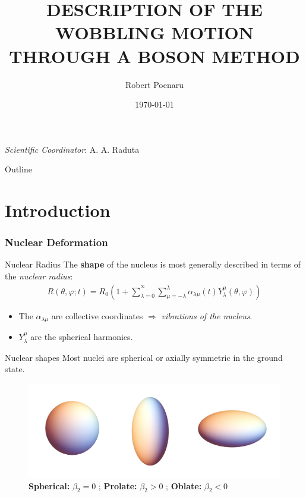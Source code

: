 \documentclass{beamer}
\title[presentation]{DESCRIPTION OF THE WOBBLING MOTION THROUGH A BOSON METHOD}
\author{Robert Poenaru}
\institute{DFT, IFIN-HH\\Doctoral School of Physics, UB}
\date{\today}
\begin{document}
\begin{frame}
  \titlepage
  \vspace{1em}\emph{Scientific Coordinator}: A. A. Raduta
\end{frame}

\begin{frame}{Outline}
 \tableofcontents
\end{frame}

\section{Introduction}

\begin{frame}
  \frametitle{Nuclear Deformation}

  \begin{exampleblock}{Nuclear Radius}
    The \textbf{shape} of the nucleus is most generally described in terms of the \emph{nuclear radius}:
    \begin{align}
      R(\theta,\varphi;t)=R_0\left(1+\sum_{\lambda=0}^{^\infty}\sum_{\mu=-\lambda}^\lambda\alpha_{\lambda\mu}(t)Y_\lambda^\mu(\theta,\varphi)\right)
    \end{align}
  \end{exampleblock}
\begin{itemize}
  \item The $\alpha_{\lambda\mu}$ are collective coordinates $\Longrightarrow$ \emph{vibrations of the nucleus}.
  \item $Y_\lambda^\mu$ are the spherical harmonics.
\end{itemize}
\end{frame}


\begin{frame}{Nuclear shapes}
  Most nuclei are spherical or axially symmetric in the ground state.
    \begin{figure}
      \centering
      \includegraphics[scale=0.4]{figures/nuclear_shapes.png}
      \caption{\textbf{Spherical:} $\beta_2=0$ ; \textbf{Prolate:} $\beta_2>0$ ; \textbf{Oblate:} $\beta_2<0$}
    \end{figure}
  \end{frame}
\end{document}
